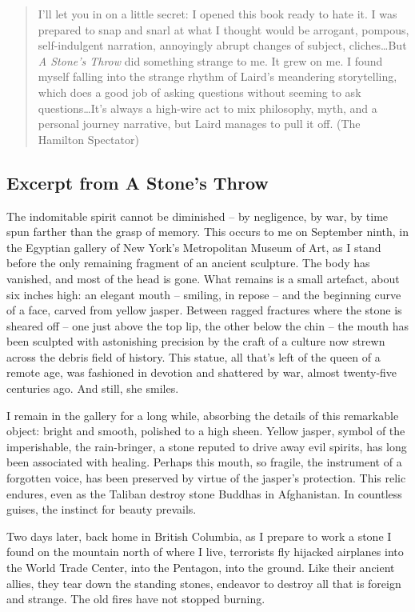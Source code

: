 \documentclass[10pt,DIV09,letterpaper,oneside,headsepline]{scrreprt}
\begin{document}
\begin{quotation} I'll let you in on a little secret: I opened this book ready to hate it. I was prepared to snap and snarl at what I thought would be arrogant, pompous, self-indulgent narration, annoyingly abrupt changes of subject, cliches\ldots But \textit{A Stone's Throw} did something strange to me. It grew on me. I found myself falling into the strange rhythm of Laird's meandering storytelling, which does a good job of asking questions without seeming to ask questions\ldots It's always a high-wire act to mix philosophy, myth, and a personal journey narrative, but Laird manages to pull it off. (The Hamilton Spectator) \end{quotation}

\newpage
\subsection{Excerpt from A Stone's Throw}

The indomitable spirit cannot be diminished -- by negligence, by war, by time spun farther than the grasp of memory. This occurs to me on September ninth, in the Egyptian gallery of New York's Metropolitan Museum of Art, as I stand before the only remaining fragment of an ancient sculpture. The body has vanished, and most of the head is gone. What remains is a small artefact, about six inches high: an elegant mouth -- smiling, in repose -- and the beginning curve of a face, carved from yellow jasper. Between ragged fractures where the stone is sheared off -- one just above the top lip, the other below the chin -- the mouth has been sculpted with astonishing precision by the craft of a culture now strewn across the debris field of history. This statue, all that's left of the queen of a remote age, was fashioned in devotion and shattered by war, almost twenty-five centuries ago. And still, she smiles.

I remain in the gallery for a long while, absorbing the details of this remarkable object: bright and smooth, polished to a high sheen. Yellow jasper, symbol of the imperishable, the rain-bringer, a stone reputed to drive away evil spirits, has long been associated with healing. Perhaps this mouth, so fragile, the instrument of a forgotten voice, has been preserved by virtue of the jasper's protection. This relic endures, even as the Taliban destroy stone Buddhas in Afghanistan. In countless guises, the instinct for beauty prevails.

Two days later, back home in British Columbia, as I prepare to work a stone I found on the mountain north of where I live, terrorists fly hijacked airplanes into the World Trade Center, into the Pentagon, into the ground. Like their ancient allies, they tear down the standing stones, endeavor to destroy all that is foreign and strange. The old fires have not stopped burning.
\end{document}
